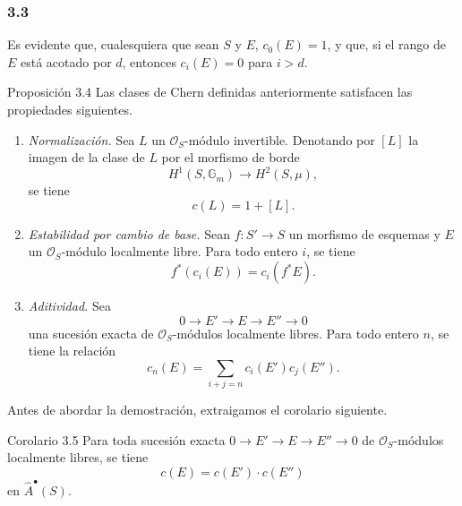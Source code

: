 \subsubsection*{3.3}
Es evidente que, cualesquiera que sean $S$ y $E$, $c_0(E)=1$, y que, si el rango de $E$ está acotado por $d$, entonces $c_i(E)=0$ para $i>d$.

\begin{statement}{Proposición 3.4}
Las clases de Chern definidas anteriormente satisfacen las propiedades siguientes.
\begin{enumerate}[label=(\roman*)]
\item \emph{Normalización.} Sea $L$ un $\mathcal O_S$-módulo invertible. Denotando por $[L]$ la imagen de la clase de $L$ por el morfismo de borde
\[
H^1(S,\mathbb G_m)\longrightarrow H^2(S,\mu),
\]
se tiene
\[
c(L)=1+[L].
\]
\item \emph{Estabilidad por cambio de base.} Sean $f:S'\to S$ un morfismo de esquemas y $E$ un $\mathcal O_S$-módulo localmente libre. Para todo entero $i$, se tiene
\[
f^*(c_i(E))=c_i(f^*E).
\]
\item \emph{Aditividad.} Sea
\[
0\to E'\to E\to E''\to0
\]
una sucesión exacta de $\mathcal O_S$-módulos localmente libres. Para todo entero $n$, se tiene la relación
\[
c_n(E)=\sum_{i+j=n}c_i(E')c_j(E'').
\]
\end{enumerate}
\end{statement}

Antes de abordar la demostración, extraigamos el corolario siguiente.

\begin{statement}{Corolario 3.5}
Para toda sucesión exacta $0\to E'\to E\to E''\to0$ de $\mathcal O_S$-módulos localmente libres, se tiene
\[
c(E)=c(E')\cdot c(E'')
\]
en $\widehat A^{\bullet}(S)$.
\end{statement}
